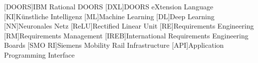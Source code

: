 
\begin{acronym}
	[DOORS]{IBM Rational DOORS}
	[DXL]{DOORS eXtension Language}
	[KI]{Künstliche Intelligenz}
	[ML]{Machine Learning}
	[DL]{Deep Learning}
	[NN]{Neuronales Netz}
	[ReLU]{Rectified Linear Unit}
	[RE]{Requirements Engineering}
	[RM]{Requirements Management}
	[IREB]{International Requirements Engineering Boards}
	[SMO RI]{Siemens Mobility Rail Infrastructure}
	[API]{Application Programming Interface}
\end{acronym}


